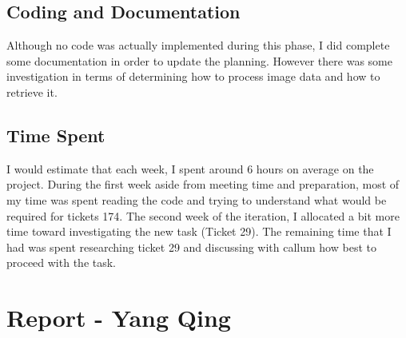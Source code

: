\documentclass{article}
\begin{document}
\subsection{Coding and Documentation}

Although no code was actually implemented during this phase, I did complete some documentation in order to update the planning. However there was some investigation in terms of determining how to process image data and how to retrieve it.

\subsection{Time Spent}

I would estimate that each week, I spent around 6 hours on average on the project. During the first week aside from meeting time and preparation, most of my time was spent reading the code and trying to understand what would be required for tickets 174. The second week of the iteration, I allocated a bit more time toward investigating the new task (Ticket 29). The remaining time that I had was spent researching ticket 29 and discussing with callum how best to proceed with the task.

\newpage{}

\section{Report - Yang Qing}
\end{document}
